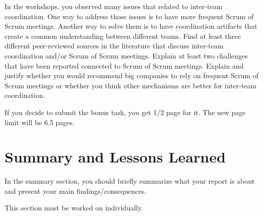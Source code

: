\documentclass[conference]{IEEEtran}
\begin{document}
In the workshops, you observed many issues that related to inter-team coordination. One way to address those issues is to have more frequent Scrum of Scrum meetings. Another way to solve them is to have coordination artifacts that create a common understanding between different teams. Find at least three different peer-reviewed sources in the literature that discuss inter-team coordination and/or Scrum of Scrum meetings. Explain at least two challenges that have been reported connected to Scrum of Scrum meetings. Explain and justify whether you would recommend big companies to rely on frequent Scrum of Scrum meetings or whether you think other mechanisms are better for inter-team coordination. 

If you decide to submit the bonus task, you get 1/2 page for it. The new page limit will be 6.5 pages.

\section{Summary and Lessons Learned}
\label{sec:summary}
In the summary section, you should briefly summarize what your report is about and present your main findings/consequences.

This section must be worked on individually.



\end{document}
